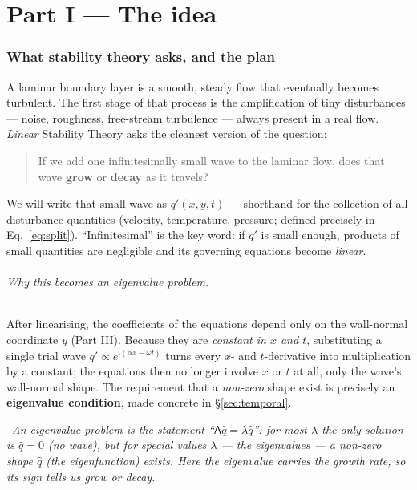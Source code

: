 \documentclass[11pt]{article}
\newcommand{\plain}[1]{\par\smallskip\noindent{\color{kicol}\textbf{In plain words.}}\ \textit{#1}\par\smallskip}
\newcommand{\imag}{\mathrm{i}}
\newcommand{\hatq}{\hat{q}}
\begin{document}
\part*{Part I --- The idea}

\section{What stability theory asks, and the plan}\label{sec:idea}
A laminar boundary layer is a smooth, steady flow that eventually becomes turbulent. The first stage of
that process is the amplification of tiny disturbances --- noise, roughness, free-stream turbulence ---
always present in a real flow. \emph{Linear} Stability Theory asks the cleanest version of the question:

\begin{quote}
If we add one infinitesimally small wave to the laminar flow, does that wave \textbf{grow} or
\textbf{decay} as it travels?
\end{quote}

We will write that small wave as $q'(x,y,t)$ --- shorthand for the collection of all disturbance
quantities (velocity, temperature, pressure; defined precisely in Eq.~\eqref{eq:split}). ``Infinitesimal''
is the key word: if $q'$ is small enough, products of small quantities are negligible and its governing
equations become \emph{linear}.

\paragraph{Why this becomes an eigenvalue problem.} After linearising, the coefficients of the equations
depend only on the wall-normal coordinate $y$ (Part III). Because they are \emph{constant in $x$ and $t$},
substituting a single trial wave $q'\propto e^{\imag(\alpha x-\omega t)}$ turns every $x$- and
$t$-derivative into multiplication by a constant; the equations then no longer involve $x$ or $t$ at all,
only the wave's wall-normal shape. The requirement that a \emph{non-zero} shape exist is precisely an
\textbf{eigenvalue condition}, made concrete in \S\ref{sec:temporal}.

\plain{An eigenvalue problem is the statement ``$\mathsf{A}\hatq=\lambda\hatq$'': for most $\lambda$ the
only solution is $\hatq=0$ (no wave), but for special values $\lambda$ --- the eigenvalues --- a non-zero
shape $\hatq$ (the eigenfunction) exists. Here the eigenvalue carries the growth rate, so its sign tells us
grow or decay.}
\end{document}
